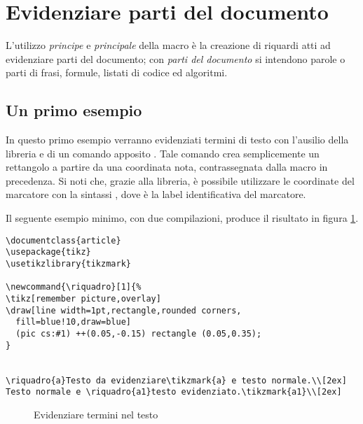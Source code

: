 \section{Evidenziare parti del documento}

L'utilizzo \emph{principe} e \emph{principale} della  macro è la creazione di riquardi atti ad evidenziare parti del documento; con \emph{parti del documento} si intendono parole o parti di frasi, formule, listati di codice ed algoritmi. 

\subsection{Un primo esempio}
In questo primo esempio verranno evidenziati termini di testo con l'ausilio della libreria  e di un comando apposito . Tale comando crea semplicemente un rettangolo a partire da una coordinata nota, contrassegnata dalla  macro in precedenza. Si noti che, grazie alla libreria, è possibile utilizzare le coordinate del marcatore con la sintassi , dove  è la label identificativa del marcatore.

Il seguente esempio minimo, con due compilazioni, produce il risultato in figura \ref{fig:evidenziatermini}.
\begin{lstlisting}[frame=lines]
\documentclass{article}
\usepackage{tikz}
\usetikzlibrary{tikzmark}

\newcommand{\riquadro}[1]{%
\tikz[remember picture,overlay]
\draw[line width=1pt,rectangle,rounded corners,
  fill=blue!10,draw=blue]
  (pic cs:#1) ++(0.05,-0.15) rectangle (0.05,0.35);
}


\riquadro{a}Testo da evidenziare\tikzmark{a} e testo normale.\\[2ex]
Testo normale e \riquadro{a1}testo evidenziato.\tikzmark{a1}\\[2ex]

\end{lstlisting}

\begin{figure}[ht]
\centering
{}
\caption{Evidenziare termini nel testo}
\label{fig:evidenziatermini}
\end{figure}


